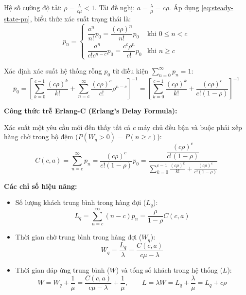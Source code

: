 Hệ số cường độ tải: $\rho = \frac{\lambda}{c\mu} < 1$. Tải đề nghị: $a = \frac{\lambda}{\mu} = c\rho$.
Áp dụng \eqref{eq:steady-state-pn}, biểu thức xác suất trạng thái là:
\begin{equation}
    p_n = \begin{cases}
        \dfrac{a^n}{n!} p_0 = \dfrac{(c\rho)^n}{n!} p_0 & \text{khi } 0 \le n < c \\[8pt]
        \dfrac{a^n}{c! c^{n-c}} p_0 = \dfrac{c^c \rho^n}{c!} p_0 & \text{khi } n \ge c
    \end{cases}
\end{equation}

Xác định xác suất hệ thống rỗng $p_0$ từ điều kiện $\sum_{n=0}^\infty p_n = 1$:
\begin{equation}
    p_0 = \left[ \sum_{k=0}^{c-1} \frac{(c\rho)^k}{k!} + \sum_{n=c}^\infty \frac{(c\rho)^c}{c!} \rho^{n-c} \right]^{-1} = \left[ \sum_{k=0}^{c-1} \frac{(c\rho)^k}{k!} + \frac{(c\rho)^c}{c!(1 - \rho)} \right]^{-1}
    \label{eq:mmc-p0}
\end{equation}

\textbf{Công thức trễ Erlang-C (Erlang's Delay Formula):}

Xác suất một yêu cầu mới đến thấy tất cả $c$ máy chủ đều bận và buộc phải xếp hàng chờ trong bộ đệm ($P(W_q > 0) = P(n \ge c)$):
\begin{equation}
    C(c, a) = \sum_{n=c}^\infty p_n = \frac{(c\rho)^c}{c!(1 - \rho)} p_0 = \frac{\dfrac{(c\rho)^c}{c!(1 - \rho)}}{\displaystyle\sum_{k=0}^{c-1}\frac{(c\rho)^k}{k!} + \frac{(c\rho)^c}{c!(1 - \rho)}}
    \label{eq:erlang-c-formula}
\end{equation}

\textbf{Các chỉ số hiệu năng:}
\begin{itemize}[leftmargin=1.5em]
    \item Số lượng khách trung bình trong hàng đợi ($L_q$):
    \begin{equation}
        L_q = \sum_{n=c}^\infty (n - c) p_n = \frac{\rho}{1 - \rho} C(c, a)
    \end{equation}
    \item Thời gian chờ trung bình trong hàng đợi ($W_q$):
    \begin{equation}
        W_q = \frac{L_q}{\lambda} = \frac{C(c, a)}{c\mu - \lambda}
    \end{equation}
    \item Thời gian đáp ứng trung bình ($W$) và tổng số khách trong hệ thống ($L$):
    \begin{equation}
        W = W_q + \frac{1}{\mu} = \frac{C(c, a)}{c\mu - \lambda} + \frac{1}{\mu}, \qquad L = \lambda W = L_q + \frac{\lambda}{\mu} = L_q + c\rho
    \end{equation}
\end{itemize}

